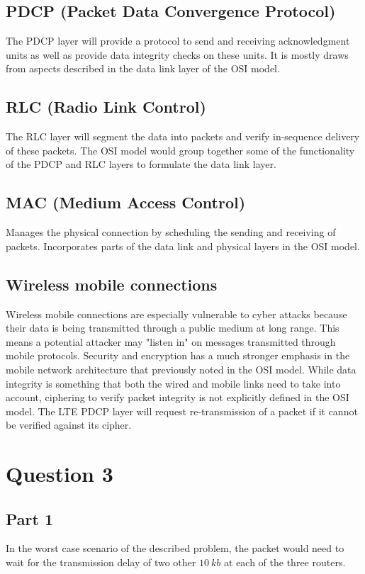 \documentclass[12pt,letterpaper]{article}
\begin{document}
\subsection*{PDCP (Packet Data Convergence Protocol)}
The PDCP layer will provide a protocol to send and receiving acknowledgment
units as well as provide data integrity checks on these units. It is mostly draws
from aspects described in the data link layer of the OSI model.

\subsection*{RLC (Radio Link Control)}
The RLC layer will segment the data into packets and verify in-sequence delivery
of these packets. The OSI model would group together some of the functionality of
the PDCP and RLC layers to formulate the data link layer.

\subsection*{MAC (Medium Access Control)}
Manages the physical connection by scheduling the sending and receiving of
packets. Incorporates parts of the data link and physical layers in the OSI model.

\subsection*{Wireless mobile connections}
Wireless mobile connections are especially vulnerable to cyber attacks because their
data is being transmitted through a public medium at long range. This means a potential
attacker may "listen in" on messages transmitted through mobile protocols. Security and
encryption has a much stronger emphasis in the mobile network architecture that previously
noted in the OSI model. While data integrity is something that both the wired and mobile
links need to take into account, ciphering to verify packet integrity is not explicitly
defined in the OSI model. The LTE PDCP layer will request re-transmission of a packet if
it cannot be verified against its cipher.

\section*{Question 3}
\subsection*{Part 1}
In the worst case scenario of the described problem, the packet would need to wait
for the transmission delay of two other $\SI{10}{kb}$ at each of the three
routers.
\end{document}
